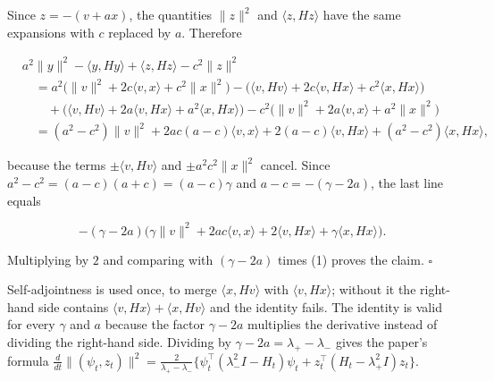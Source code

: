 \documentclass[11pt,a4paper]{article}
\begin{document}
Since \(z=-(v+ax)\), the quantities \(\|z\|^2\) and \(\langle z,Hz\rangle\) have the same expansions with \(c\) replaced by \(a\). Therefore


\[\begin{aligned}
&a^2\|y\|^2-\langle y,Hy\rangle+\langle z,Hz\rangle-c^2\|z\|^2\\
&\quad=a^2\bigl(\|v\|^2+2c\langle v,x\rangle+c^2\|x\|^2\bigr)-\bigl(\langle v,Hv\rangle+2c\langle v,Hx\rangle+c^2\langle x,Hx\rangle\bigr)\\
&\qquad+\bigl(\langle v,Hv\rangle+2a\langle v,Hx\rangle+a^2\langle x,Hx\rangle\bigr)-c^2\bigl(\|v\|^2+2a\langle v,x\rangle+a^2\|x\|^2\bigr)\\
&\quad=(a^2-c^2)\|v\|^2+2ac(a-c)\langle v,x\rangle+2(a-c)\langle v,Hx\rangle+(a^2-c^2)\langle x,Hx\rangle ,
\end{aligned}\]


because the terms \(\pm\langle v,Hv\rangle\) and \(\pm a^2c^2\|x\|^2\) cancel. Since \(a^2-c^2=(a-c)(a+c)=(a-c)\gamma\) and \(a-c=-(\gamma-2a)\), the last line equals


\[-(\gamma-2a)\bigl(\gamma\|v\|^2+2ac\langle v,x\rangle+2\langle v,Hx\rangle+\gamma\langle x,Hx\rangle\bigr).\]


Multiplying by \(2\) and comparing with \((\gamma-2a)\) times (1) proves the claim. \(\square\)




Self-adjointness is used once, to merge \(\langle x,Hv\rangle\) with \(\langle v,Hx\rangle\); without it the right-hand side contains \(\langle v,Hx\rangle+\langle x,Hv\rangle\) and the identity fails. The identity is valid for every \(\gamma\) and \(a\) because the factor \(\gamma-2a\) multiplies the derivative instead of dividing the right-hand side. Dividing by \(\gamma-2a=\lambda_+-\lambda_-\) gives the paper's formula \(\frac{d}{dt}\|(\psi_t,z_t)\|^2=\frac{2}{\lambda_+-\lambda_-}\{\psi_t^\top(\lambda_-^2I-H_t)\psi_t+z_t^\top(H_t-\lambda_+^2I)z_t\}\).
\end{document}
